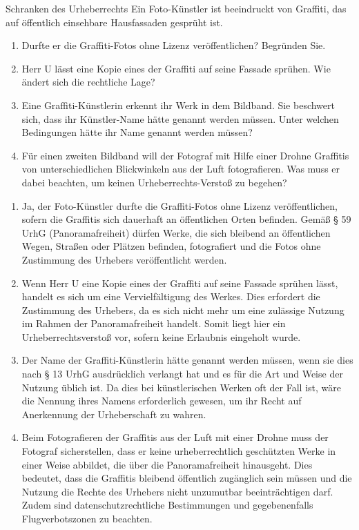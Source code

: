 \documentclass{article}
\begin{document}
\begin{exercise}{Schranken des Urheberrechts}
  Ein Foto-Künstler ist beeindruckt von Graffiti, das auf öffentlich einsehbare Hausfassaden gesprüht ist.
  \begin{enumerate}
    \item Durfte er die Graffiti-Fotos ohne Lizenz veröffentlichen? Begründen Sie.
    \item Herr U lässt eine Kopie eines der Graffiti auf seine Fassade sprühen. Wie ändert sich die rechtliche Lage?
    \item Eine Graffiti-Künstlerin erkennt ihr Werk in dem Bildband. Sie beschwert sich, dass ihr Künstler-Name hätte genannt werden müssen. Unter welchen Bedingungen hätte ihr Name genannt werden müssen?
    \item Für einen zweiten Bildband will der Fotograf mit Hilfe einer Drohne Graffitis von unterschiedlichen Blickwinkeln aus der Luft fotografieren. Was muss er dabei beachten, um keinen Urheberrechts-Verstoß zu begehen?
  \end{enumerate}

  \begin{solution}
    \begin{enumerate}
      \item Ja, der Foto-Künstler durfte die Graffiti-Fotos ohne Lizenz veröffentlichen, sofern die Graffitis sich dauerhaft an öffentlichen Orten befinden. Gemäß § 59 UrhG (Panoramafreiheit) dürfen Werke, die sich bleibend an öffentlichen Wegen, Straßen oder Plätzen befinden, fotografiert und die Fotos ohne Zustimmung des Urhebers veröffentlicht werden.
      \item Wenn Herr U eine Kopie eines der Graffiti auf seine Fassade sprühen lässt, handelt es sich um eine Vervielfältigung des Werkes. Dies erfordert die Zustimmung des Urhebers, da es sich nicht mehr um eine zulässige Nutzung im Rahmen der Panoramafreiheit handelt. Somit liegt hier ein Urheberrechtsverstoß vor, sofern keine Erlaubnis eingeholt wurde.
      \item Der Name der Graffiti-Künstlerin hätte genannt werden müssen, wenn sie dies nach § 13 UrhG ausdrücklich verlangt hat und es für die Art und Weise der Nutzung üblich ist. Da dies bei künstlerischen Werken oft der Fall ist, wäre die Nennung ihres Namens erforderlich gewesen, um ihr Recht auf Anerkennung der Urheberschaft zu wahren.
      \item Beim Fotografieren der Graffitis aus der Luft mit einer Drohne muss der Fotograf sicherstellen, dass er keine urheberrechtlich geschützten Werke in einer Weise abbildet, die über die Panoramafreiheit hinausgeht. Dies bedeutet, dass die Graffitis bleibend öffentlich zugänglich sein müssen und die Nutzung die Rechte des Urhebers nicht unzumutbar beeinträchtigen darf. Zudem sind datenschutzrechtliche Bestimmungen und gegebenenfalls Flugverbotszonen zu beachten.
    \end{enumerate}
  \end{solution}
\end{exercise}
\end{document}
